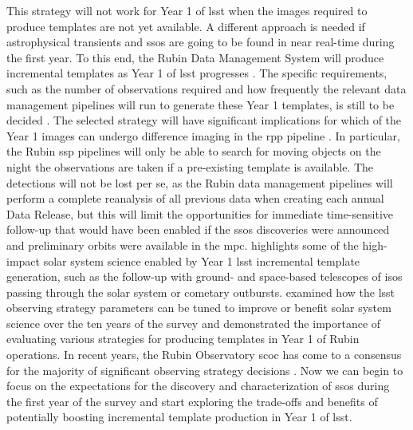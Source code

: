 \documentclass[preprintm,linenumbers]{aastex631}
\begin{document}
This strategy will not work for Year 1 of \gls*{lsst} when the images required to produce templates are not yet available.  A different approach is needed if astrophysical transients and \glspl*{sso} are going to be found in near real-time during the first year. To this end, the Rubin Data Management System will produce incremental templates as Year 1 of \gls*{lsst} progresses \citep{RTN-011}. %
	The specific requirements, such as the number of observations required and how frequently the relevant data management pipelines will run to generate these Year 1 templates, is still to be decided \citep{SCOC_Report_3}. The selected strategy will have significant implications for which of the Year 1 images can undergo difference imaging in the \gls*{rpp} pipeline \citep{DMTN-107,RTN-011}. 
	In particular, the Rubin \gls*{ssp} pipelines will only be able to search for moving objects on the night the observations are taken if a pre-existing template is available. 
	The detections will not be lost per se, as the Rubin data management pipelines will perform a complete reanalysis of all previous data when creating each annual Data Release, but this will limit the opportunities for immediate time-sensitive follow-up that would have been enabled if the \glspl*{sso} discoveries were announced and preliminary orbits were available in the \gls*{mpc}.
 \cite{2021RNAAS...5..143S} highlights some of the high-impact solar system science enabled by Year 1 \gls*{lsst} incremental template generation, such as the follow-up with ground- and space-based telescopes of \glspl*{iso} passing through the solar system or cometary outbursts. 
	\cite{schwambTuningLegacySurvey2023} examined how the \gls*{lsst} observing strategy parameters can be tuned to improve or benefit solar system science over the ten years of the survey and demonstrated the importance of evaluating various strategies for producing templates in Year 1 of Rubin operations. 
 In recent years, the Rubin Observatory \gls*{scoc} has come to a consensus for the majority of significant observing strategy decisions \citep{SCOC_Report_1, SCOC_Report_2,SCOC_Report_3}. Now we can begin to focus on the expectations for the discovery and characterization of \glspl*{sso} during the first year of the survey and start exploring the trade-offs and benefits of potentially boosting incremental template production in Year 1 of \gls*{lsst}. 
 
\end{document}
